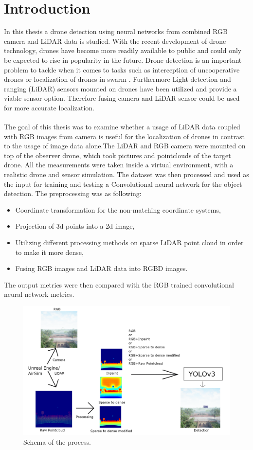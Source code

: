 \documentclass[twoside]{ctuthesis}
\theoremstyle{plain}
\theoremstyle{definition}
\theoremstyle{note}
\begin{document}
\maketitle
\chapter{Introduction}
In this thesis a drone detection using neural networks from combined RGB camera and LiDAR data is studied. With the recent development of drone technology, drones have become more readily available to public and could only be expected to rise in popularity in the future. Drone detection is an important problem to tackle when it comes to tasks such as interception of uncooperative drones \cite{cite:1} or localization of drones in swarm \cite{cite:2} \cite{cite:3}. Furthermore Light detection and ranging (LiDAR) sensors mounted on drones have been utilized \cite{cite:4} and provide a viable sensor option. Therefore fusing camera and LiDAR sensor could be used for more accurate localization.\\
\\
The goal of this thesis was to examine whether a usage of LiDAR data coupled with RGB images from camera is useful for the localization of drones in contrast to the usage of image data alone.The LiDAR and RGB camera were mounted on top of the observer drone, which took pictures and pointclouds of the target drone. All the measurements were taken inside a virtual environment, with a realistic drone and sensor simulation. The dataset was then processed and used as the input for training and testing a Convolutional neural network for the object detection. The preprocessing was as following:
\begin{itemize}
	\item Coordinate transformation for the non-matching coordinate systems,
	\item Projection of 3d points into a 2d image,
	\item Utilizing different processing methods on sparse LiDAR point cloud in order to make it more dense,
	\item Fusing RGB images and LiDAR data into RGBD images.
\end{itemize}
The output metrics were then compared with the RGB trained convolutional neural network metrics.
\begin{figure}[h]
	\centering
	\includegraphics[width=\textwidth]{intro_schemav2.png}
	\caption{Schema of the process.}
\end{figure}
\end{document}
